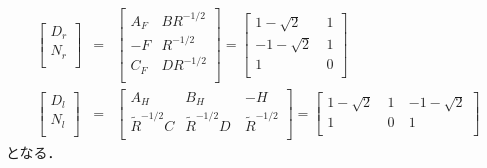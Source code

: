 \documentclass[a4paper,12pt]{jarticle}
\begin{document}
%
\begin{eqnarray}
 \left[
  \begin{array}{c}
   D_r  \\ 
   N_r   \\ 
  \end{array}
\right]
&=&
\left[
  \begin{array}{c|c}
   A_F & BR^{-1/2}  \\ \hline
  -F   & R^{-1/2}   \\
  C_F  & DR^{-1/2} \\
  \end{array}
\right]
=
\left[
  \begin{array}{c|c}
   1-\sqrt{2} &~ 1  \\ \hline
  -1-\sqrt{2} &~ 1   \\
  1           &~0 \\ 
  \end{array}
\right]\\
 \left[
  \begin{array}{c}
   D_l  \\ 
   N_l   \\ 
  \end{array}
\right]
&=&
\left[
  \begin{array}{c|cc}
   A_H             & B_H               &-H \\ \hline
  \tilde{R}^{-1/2}C& \tilde{R}^{-1/2}D~& \tilde{R}^{-1/2} \\ 
  \end{array}
  \right]
=
\left[
  \begin{array}{c|cc}
   1-\sqrt{2} &~ 1 ~&-1-\sqrt{2} \\ \hline
  1           &~ 0 ~& 1 \\ 
  \end{array}
  \right]
\end{eqnarray}
となる．
%
\end{document}
